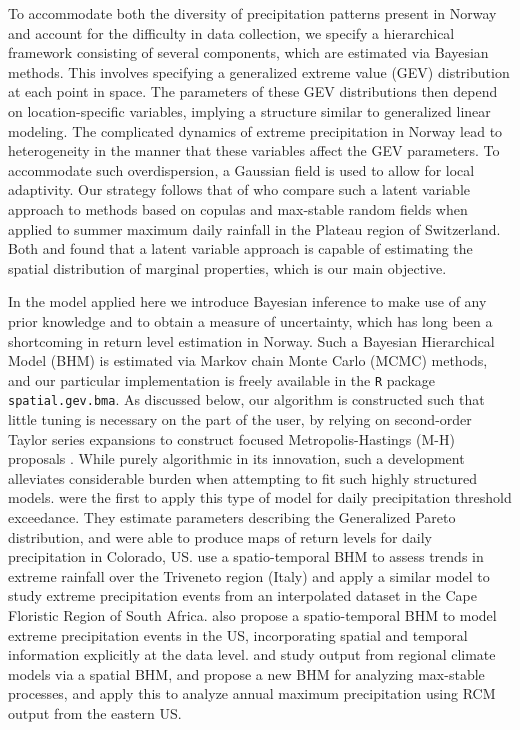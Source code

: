 \documentclass[11pt,english]{article}
\begin{document}

To accommodate both the diversity of precipitation patterns present in Norway and account for the difficulty in data collection, we specify a hierarchical framework consisting of several components, which are estimated via Bayesian methods.  This involves specifying a generalized extreme value (GEV) distribution at each point in space.  The parameters of these GEV distributions then depend on location-specific variables, implying a structure similar to generalized linear modeling.  The complicated dynamics of extreme precipitation in Norway lead to heterogeneity in the manner that these variables affect the GEV parameters. To accommodate such overdispersion, a Gaussian field is used to allow for local adaptivity. Our strategy follows that of \cite{Davisonetal2012} who compare such a latent variable approach to methods based on copulas and max-stable random fields when applied to summer maximum daily rainfall in the Plateau region of Switzerland. Both \cite{Davisonetal2012} and \cite{ApputhuraiandStephenson2013} found that a latent variable approach is capable of estimating the spatial distribution of marginal properties, which is our main objective.
 
In the model applied here we introduce Bayesian inference to make use of any prior knowledge and to obtain a measure of uncertainty, which has long been a shortcoming in return level estimation in Norway. Such a Bayesian Hierarchical Model (BHM) is estimated via Markov chain Monte Carlo (MCMC) methods, and our particular implementation is freely available in the {\tt R} package {\tt spatial.gev.bma}.  As discussed below, our algorithm is constructed such that little tuning is necessary on the part of the user, by relying on second-order Taylor series expansions to construct focused Metropolis-Hastings (M-H) proposals \citep{RueHeld2005}. While purely algorithmic in its innovation, such a development alleviates considerable burden when attempting to fit such highly structured models.  \cite{Cooleyetal2007} were the first to apply this type of model for daily precipitation threshold exceedance. They estimate parameters describing the Generalized Pareto distribution, and were able to produce maps of return levels for daily precipitation in Colorado, US. \cite{GaetanandGrigoletto2007} use a spatio-temporal BHM to assess trends in extreme rainfall over the Triveneto region (Italy) and \cite{SangandGelfand2009} apply a similar model to study extreme precipitation events from an interpolated dataset in the Cape Floristic Region of South Africa. \cite{GhoshandMallick2011} also propose a spatio-temporal BHM to model extreme precipitation events in the US, incorporating spatial and temporal information explicitly at the data level. \cite{CooleyandSain2010} and \cite{Schliepetal2010} study output from regional climate models via a spatial BHM, and \cite{ReichandShaby2013} propose a new BHM for analyzing max-stable processes, and apply this to analyze annual maximum precipitation using RCM output from the eastern US. 
\end{document}
